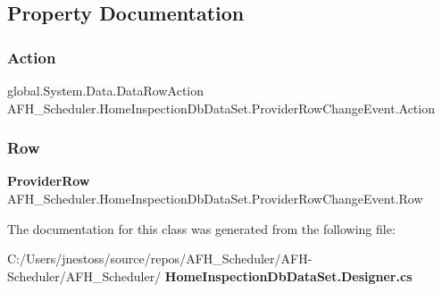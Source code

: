 \subsection{Property Documentation}
\mbox{\label{class_a_f_h___scheduler_1_1_home_inspection_db_data_set_1_1_provider_row_change_event_ac7a1d4a9efd4ec682f5525c4bcca5aac}} 
\subsubsection{Action}
{\footnotesize\ttfamily global.\+System.\+Data.\+Data\+Row\+Action A\+F\+H\+\_\+\+Scheduler.\+Home\+Inspection\+Db\+Data\+Set.\+Provider\+Row\+Change\+Event.\+Action\hspace{0.3cm}{\ttfamily [get]}}

\mbox{\label{class_a_f_h___scheduler_1_1_home_inspection_db_data_set_1_1_provider_row_change_event_a4b7461efd63fc7c0e97d50e2d380a277}} 
\subsubsection{Row}
{\footnotesize\ttfamily \textbf{ Provider\+Row} A\+F\+H\+\_\+\+Scheduler.\+Home\+Inspection\+Db\+Data\+Set.\+Provider\+Row\+Change\+Event.\+Row\hspace{0.3cm}{\ttfamily [get]}}



The documentation for this class was generated from the following file\+:\begin{DoxyCompactItemize}
\item 
C\+:/\+Users/jnestoss/source/repos/\+A\+F\+H\+\_\+\+Scheduler/\+A\+F\+H-\/\+Scheduler/\+A\+F\+H\+\_\+\+Scheduler/\textbf{ Home\+Inspection\+Db\+Data\+Set.\+Designer.\+cs}\end{DoxyCompactItemize}
